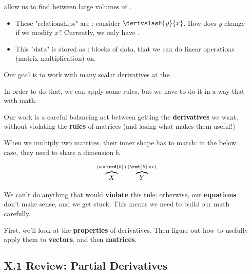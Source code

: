     \begin{concept}
         allow us to find  between large volumes of .
        
        \begin{itemize}
            \item These "relationships" are : consider $\derivslash{y}{x}$. How does $y$ change if we modify $x$? Currently, we only have .
            
            \item This "data" is stored as : blocks of data, that we can do linear operations (matrix multiplication) on.
        \end{itemize}
        
        Our goal is to work with many scalar derivatives at the . 
        
        In order to do that, we can apply some  rules, but we have to do it in a way that  with  math.
    \end{concept}
    
    Our work is a careful balancing act between getting the \textbf{derivatives} we want, without violating the \textbf{rules} of matrices (and losing what makes them useful!)
    
    \miniex When we multiply two matrices, their inner shape has to match: in the below case, they need to share a dimension $b$.
    
    \begin{equation}
        \overbrace{
            X
        }^{ (a \times \red{b}) }
        \overbrace{
            Y
        }^{(\red{b} \times c)}
    \end{equation}
    
    We can't do anything that would \textbf{violate} this rule: otherwise, our \textbf{equations} don't make sense, and we get stuck. This means we need to build our math carefully.
    
    First, we'll look at the \textbf{properties} of derivatives. Then figure out how to usefully apply them to \textbf{vectors}, and then \textbf{matrices}.
    
    \secdiv
    
    \subsection*{X.1 \quad Review: Partial Derivatives}
    
